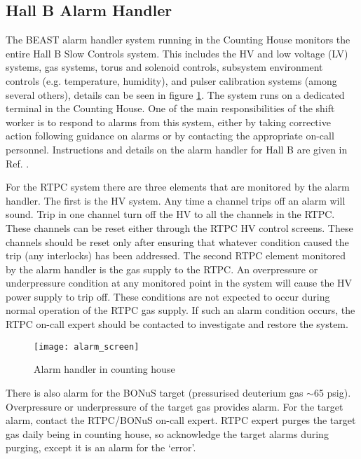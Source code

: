 \subsection{Hall B Alarm Handler}
\label{sub-sec:alarm}

The BEAST alarm handler system running in the Counting House monitors the entire Hall B Slow Controls system. This includes the HV and low voltage (LV) systems, gas systems, torus and solenoid controls, subsystem environment controls (e.g. temperature, humidity), and pulser calibration systems (among several others), details can be seen in figure \ref{fig:alarm_screen}. The system runs on a dedicated terminal in the Counting House. One of the main responsibilities of the shift worker is to respond to alarms from this system, either by taking corrective action following guidance on alarms or by contacting the appropriate on-call personnel. Instructions and details on the alarm handler for Hall B are given in Ref. \cite{alarm-page}.

For the RTPC system there are three elements that are monitored by the alarm handler. The first is the HV system. Any time a channel trips off an alarm will sound. Trip in one channel turn off the HV to all the channels in the RTPC. These channels can be reset either through the RTPC HV control screens. These channels should be reset only after ensuring that whatever condition caused the trip (any interlocks) has been addressed. The second RTPC element monitored by the alarm handler is the gas supply to the RTPC. An overpressure or underpressure condition at any monitored point in the system will cause the HV power supply to trip off. These conditions are not expected to occur during normal operation of the RTPC gas supply. If such an alarm condition occurs, the RTPC on-call expert should be contacted to investigate and restore the system.

\begin{figure}[H]
	\centering
	\texttt{[image: alarm\_screen]}
	\caption{Alarm handler in counting house}
	\label{fig:alarm_screen}
\end{figure}

There is also alarm for the BONuS target (pressurised deuterium gas $\sim$65 psig). Overpressure or underpressure of the target gas provides alarm. For the target alarm, contact the RTPC/BONuS on-call expert. RTPC expert purges the target gas daily being in counting house, so acknowledge the target alarms during purging, except it is an alarm for the `error'.
	

